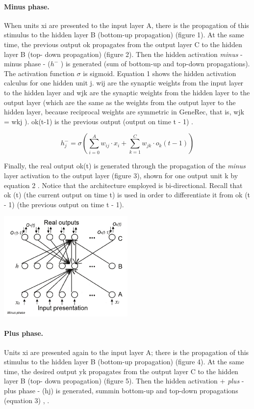 \paragraph{Minus phase.} When units xi are presented to the input layer A, there is the propagation of this stimulus to the hidden layer B (bottom-up propagation) (figure 1). At the same time, the previous output ok propagates from the output layer C to the hidden layer B (top- down propagation) (figure 2). Then the hidden activation \emph{minus} - minus phase - ($h^-$ ) is generated (sum of bottom-up and top-down propagations). The activation function $\sigma$ is sigmoid. Equation 1 shows the hidden activation calculus for one hidden unit j. wij are the synaptic weights from the input layer to the hidden layer and wjk are the synaptic weights from the hidden layer to the output layer (which are the same as the weights from the output layer to the hidden layer, because reciprocal weights are symmetric in GeneRec, that is, wjk = wkj \citet{o1996bio}). ok(t-1) is the previous output (output on time t - 1) \citet{orru2008sabio}.

$$h_j^- = \sigma \left(\sum_{i=0}^A w_{ij} \cdot x_i + \sum_{k=1}^C w_{jk} \cdot o_k(t-1)\right)$$

Finally, the real output ok(t) is generated through the propagation of the \emph{minus} layer activation to the output layer (figure 3), shown for one output unit k by equation 2 \citet{o1996bio}. Notice that the architecture employed is bi-directional. Recall that ok (t) (the current output on time t) is used in order to differentiate it from ok (t - 1) (the previous output on time t - 1).

\begin{center} 
\includegraphics[width=0.5\textwidth]{img/generec_minus_phase.png} \citet{orru2008sabio} 
\end{center} 

\paragraph{Plus phase.} Units xi are presented again to the input layer A; there is the propagation of this stimulus to the hidden layer B (bottom-up propagation) (figure 4). At the same time, the desired output yk propagates from the output layer C to the hidden layer B (top- down propagation) (figure 5). Then the hidden activation + \emph{plus} - plus phase - (hj) is generated, summin bottom-up and top-down propagations (equation 3) \citet{o1996bio}, \citet{orru2008sabio}.

